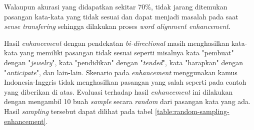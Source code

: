 Walaupun akurasi yang didapatkan sekitar 70\%, tidak jarang ditemukan pasangan kata-kata yang tidak sesuai dan dapat menjadi masalah pada saat \textit{sense transfering} sehingga dilakukan proses \textit{word alignment enhancement}.



Hasil \textit{enhancement} dengan pendekatan \textit{bi-directional} masih menghasilkan kata-kata yang memiliki pasangan tidak sesuai seperti misalnya kata "pembuat" dengan "\textit{jewelry}", kata "pendidikan" dengan "\textit{tended}", kata "harapkan" dengan "\textit{anticipate}", dan lain-lain. Skenario pada \textit{enhancement} menggunakan kamus Indonesia-Inggris tidak menghasilkan pasangan yang salah seperti pada contoh yang diberikan di atas. Evaluasi terhadap hasil \textit{enhancement} ini dilakukan dengan mengambil 10 buah \textit{sample} secara \textit{random} dari pasangan kata yang ada. Hasil \textit{sampling} tersebut dapat dilihat pada tabel \ref{table:random-sampling-enhancement}.


